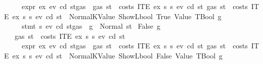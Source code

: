 \begin{isabellebody}
\ \ \ \ \ {\isachardoublequoteopen}expr\ ex\ ev\ cd\ {\isacharparenleft}{\kern0pt}st{\isasymlparr}gas\ {\isacharcolon}{\kern0pt}{\isacharequal}{\kern0pt}\ gas\ st\ {\isacharminus}{\kern0pt}\ costs\ {\isacharparenleft}{\kern0pt}ITE\ ex\ s{}\ s{}{\isacharparenright}{\kern0pt}\ ev\ cd\ st{\isasymrparr}{\isacharparenright}{\kern0pt}\ {\isacharparenleft}{\kern0pt}gas\ st\ {\isacharminus}{\kern0pt}\ costs\ {\isacharparenleft}{\kern0pt}ITE\ ex\ s{}\ s{}{\isacharparenright}{\kern0pt}\ ev\ cd\ st{\isacharparenright}{\kern0pt}\ {\isacharequal}{\kern0pt}\ Normal{\isacharparenleft}{\kern0pt}{\isacharparenleft}{\kern0pt}KValue\ {\isacharparenleft}{\kern0pt}ShowL\isactrlsub b\isactrlsub o\isactrlsub o\isactrlsub l\ True{\isacharparenright}{\kern0pt}{\isacharcomma}{\kern0pt}\ Value\ TBool{\isacharparenright}{\kern0pt}{\isacharcomma}{\kern0pt}\ g{\isacharparenright}{\kern0pt}{\isachardoublequoteclose}\isanewline
\ \ \ \ \ {\isachardoublequoteopen}stmt\ s{}\ ev\ cd\ {\isacharparenleft}{\kern0pt}st{\isasymlparr}gas\ {\isacharcolon}{\kern0pt}{\isacharequal}{\kern0pt}\ g{\isasymrparr}{\isacharparenright}{\kern0pt}\ {\isacharequal}{\kern0pt}\ Normal{\isacharparenleft}{\kern0pt}{\isacharparenleft}{\kern0pt}{\isacharparenright}{\kern0pt}{\isacharcomma}{\kern0pt}\ st{\isacharprime}{\kern0pt}{\isacharparenright}{\kern0pt}{\isachardoublequoteclose}\isanewline
{\isacharbar}{\kern0pt}\ {\isacharparenleft}{\kern0pt}False{\isacharparenright}{\kern0pt}\ g\isanewline
\ \ \ {\isachardoublequoteopen}gas\ st\ {\isachargreater}{\kern0pt}\ costs\ {\isacharparenleft}{\kern0pt}ITE\ ex\ s{}\ s{}{\isacharparenright}{\kern0pt}\ ev\ cd\ st{\isachardoublequoteclose}\isanewline
\ \ \ \ \ {\isachardoublequoteopen}expr\ ex\ ev\ cd\ {\isacharparenleft}{\kern0pt}st{\isasymlparr}gas\ {\isacharcolon}{\kern0pt}{\isacharequal}{\kern0pt}\ gas\ st\ {\isacharminus}{\kern0pt}\ costs\ {\isacharparenleft}{\kern0pt}ITE\ ex\ s{}\ s{}{\isacharparenright}{\kern0pt}\ ev\ cd\ st{\isasymrparr}{\isacharparenright}{\kern0pt}\ {\isacharparenleft}{\kern0pt}gas\ st\ {\isacharminus}{\kern0pt}\ costs\ {\isacharparenleft}{\kern0pt}ITE\ ex\ s{}\ s{}{\isacharparenright}{\kern0pt}\ ev\ cd\ st{\isacharparenright}{\kern0pt}\ {\isacharequal}{\kern0pt}\ Normal{\isacharparenleft}{\kern0pt}{\isacharparenleft}{\kern0pt}KValue\ {\isacharparenleft}{\kern0pt}ShowL\isactrlsub b\isactrlsub o\isactrlsub o\isactrlsub l\ False{\isacharparenright}{\kern0pt}{\isacharcomma}{\kern0pt}\ Value\ TBool{\isacharparenright}{\kern0pt}{\isacharcomma}{\kern0pt}\ g{\isacharparenright}{\kern0pt}{\isachardoublequoteclose}\isanewline

\end{isabellebody}
